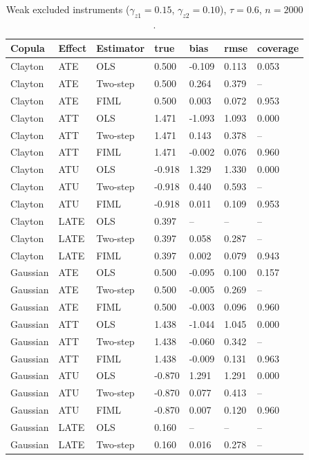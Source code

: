 \begin{table}[htbp]\centering\small
\caption{Weak excluded instruments ($\gamma_{z1} = 0.15$, $\gamma_{z2} = 0.10$), $\tau = 0.6$, $n = 2000$.}\label{tab:mc-weakiv}
\begin{tabular}{lllllll}
\hline
Copula & Effect & Estimator & true & bias & rmse & coverage
\\ \hline
Clayton & ATE & OLS & 0.500 & -0.109 & 0.113 & 0.053 \\
Clayton & ATE & Two-step & 0.500 & 0.264 & 0.379 & -- \\
Clayton & ATE & FIML & 0.500 & 0.003 & 0.072 & 0.953 \\
Clayton & ATT & OLS & 1.471 & -1.093 & 1.093 & 0.000 \\
Clayton & ATT & Two-step & 1.471 & 0.143 & 0.378 & -- \\
Clayton & ATT & FIML & 1.471 & -0.002 & 0.076 & 0.960 \\
Clayton & ATU & OLS & -0.918 & 1.329 & 1.330 & 0.000 \\
Clayton & ATU & Two-step & -0.918 & 0.440 & 0.593 & -- \\
Clayton & ATU & FIML & -0.918 & 0.011 & 0.109 & 0.953 \\
Clayton & LATE & OLS & 0.397 & -- & -- & -- \\
Clayton & LATE & Two-step & 0.397 & 0.058 & 0.287 & -- \\
Clayton & LATE & FIML & 0.397 & 0.002 & 0.079 & 0.943 \\
Gaussian & ATE & OLS & 0.500 & -0.095 & 0.100 & 0.157 \\
Gaussian & ATE & Two-step & 0.500 & -0.005 & 0.269 & -- \\
Gaussian & ATE & FIML & 0.500 & -0.003 & 0.096 & 0.960 \\
Gaussian & ATT & OLS & 1.438 & -1.044 & 1.045 & 0.000 \\
Gaussian & ATT & Two-step & 1.438 & -0.060 & 0.342 & -- \\
Gaussian & ATT & FIML & 1.438 & -0.009 & 0.131 & 0.963 \\
Gaussian & ATU & OLS & -0.870 & 1.291 & 1.291 & 0.000 \\
Gaussian & ATU & Two-step & -0.870 & 0.077 & 0.413 & -- \\
Gaussian & ATU & FIML & -0.870 & 0.007 & 0.120 & 0.960 \\
Gaussian & LATE & OLS & 0.160 & -- & -- & -- \\
Gaussian & LATE & Two-step & 0.160 & 0.016 & 0.278 & -- \\

\end{tabular}
\end{table}
